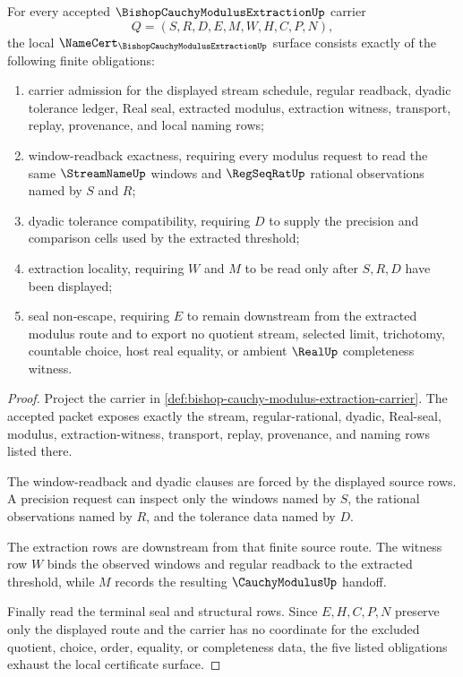\begin{theorem}
\label{thm:bishop-cauchy-modulus-extraction-namecert-obligations}
For every accepted $\BishopCauchyModulusExtractionUp$ carrier
$$
Q=(S,R,D,E,M,W,H,C,P,N),
$$
the local $\NameCert_{\BishopCauchyModulusExtractionUp}$ surface consists exactly of the following finite obligations:
\begin{enumerate}
\item carrier admission for the displayed stream schedule, regular readback, dyadic tolerance ledger, Real seal, extracted modulus, extraction witness, transport, replay, provenance, and local naming rows;
\item window-readback exactness, requiring every modulus request to read the same $\StreamNameUp$ windows and $\RegSeqRatUp$ rational observations named by $S$ and $R$;
\item dyadic tolerance compatibility, requiring $D$ to supply the precision and comparison cells used by the extracted threshold;
\item extraction locality, requiring $W$ and $M$ to be read only after $S,R,D$ have been displayed;
\item seal non-escape, requiring $E$ to remain downstream from the extracted modulus route and to export no quotient stream, selected limit, trichotomy, countable choice, host real equality, or ambient $\RealUp$ completeness witness.
\end{enumerate}
\end{theorem}
\begin{proof}
Project the carrier in \autoref{def:bishop-cauchy-modulus-extraction-carrier}. The accepted packet exposes exactly the stream, regular-rational, dyadic, Real-seal, modulus, extraction-witness, transport, replay, provenance, and naming rows listed there.

The window-readback and dyadic clauses are forced by the displayed source rows. A precision request can inspect only the windows named by $S$, the rational observations named by $R$, and the tolerance data named by $D$.

The extraction rows are downstream from that finite source route. The witness row $W$ binds the observed windows and regular readback to the extracted threshold, while $M$ records the resulting $\CauchyModulusUp$ handoff.

Finally read the terminal seal and structural rows. Since $E,H,C,P,N$ preserve only the displayed route and the carrier has no coordinate for the excluded quotient, choice, order, equality, or completeness data, the five listed obligations exhaust the local certificate surface.
\end{proof}

